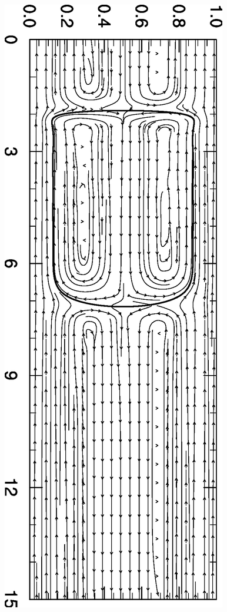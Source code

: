 \documentclass[preprint,12pt]{elsarticle}
\begin{document}
\begin{figure}
\includegraphics[angle=90,width=\textwidth]{Figures/Capillary/ca022_velocity_new.eps}\\

\end{figure}
\end{document}
